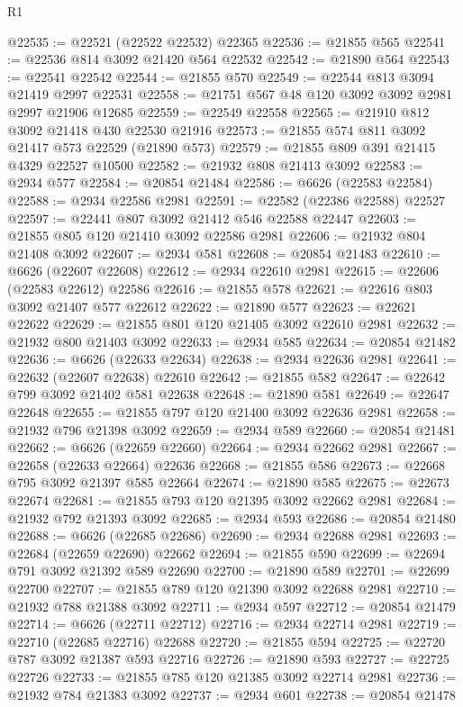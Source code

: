 \begin{lexlean}{R1}
\begin{coremodule}
@22535 := @22521 (@22522 @22532) @22365
@22536 := @21855 @565
@22541 := @22536 @814 @3092 @21420 @564 @22532
@22542 := @21890 @564
@22543 := @22541 @22542
@22544 := @21855 @570
@22549 := @22544 @813 @3094 @21419 @2997 @22531
@22558 := @21751 @567 @48 @120 @3092 @3092 @2981 @2997 @21906 @12685
@22559 := @22549 @22558
@22565 := @21910 @812 @3092 @21418 @430 @22530 @21916
@22573 := @21855 @574 @811 @3092 @21417 @573 @22529 (@21890 @573)
@22579 := @21855 @809 @391 @21415 @4329 @22527 @10500
@22582 := @21932 @808 @21413 @3092
@22583 := @2934 @577
@22584 := @20854 @21484
@22586 := @6626 (@22583 @22584)
@22588 := @2934 @22586 @2981
@22591 := @22582 (@22386 @22588) @22527
@22597 := @22441 @807 @3092 @21412 @546 @22588 @22447
@22603 := @21855 @805 @120 @21410 @3092 @22586 @2981
@22606 := @21932 @804 @21408 @3092
@22607 := @2934 @581
@22608 := @20854 @21483
@22610 := @6626 (@22607 @22608)
@22612 := @2934 @22610 @2981
@22615 := @22606 (@22583 @22612) @22586
@22616 := @21855 @578
@22621 := @22616 @803 @3092 @21407 @577 @22612
@22622 := @21890 @577
@22623 := @22621 @22622
@22629 := @21855 @801 @120 @21405 @3092 @22610 @2981
@22632 := @21932 @800 @21403 @3092
@22633 := @2934 @585
@22634 := @20854 @21482
@22636 := @6626 (@22633 @22634)
@22638 := @2934 @22636 @2981
@22641 := @22632 (@22607 @22638) @22610
@22642 := @21855 @582
@22647 := @22642 @799 @3092 @21402 @581 @22638
@22648 := @21890 @581
@22649 := @22647 @22648
@22655 := @21855 @797 @120 @21400 @3092 @22636 @2981
@22658 := @21932 @796 @21398 @3092
@22659 := @2934 @589
@22660 := @20854 @21481
@22662 := @6626 (@22659 @22660)
@22664 := @2934 @22662 @2981
@22667 := @22658 (@22633 @22664) @22636
@22668 := @21855 @586
@22673 := @22668 @795 @3092 @21397 @585 @22664
@22674 := @21890 @585
@22675 := @22673 @22674
@22681 := @21855 @793 @120 @21395 @3092 @22662 @2981
@22684 := @21932 @792 @21393 @3092
@22685 := @2934 @593
@22686 := @20854 @21480
@22688 := @6626 (@22685 @22686)
@22690 := @2934 @22688 @2981
@22693 := @22684 (@22659 @22690) @22662
@22694 := @21855 @590
@22699 := @22694 @791 @3092 @21392 @589 @22690
@22700 := @21890 @589
@22701 := @22699 @22700
@22707 := @21855 @789 @120 @21390 @3092 @22688 @2981
@22710 := @21932 @788 @21388 @3092
@22711 := @2934 @597
@22712 := @20854 @21479
@22714 := @6626 (@22711 @22712)
@22716 := @2934 @22714 @2981
@22719 := @22710 (@22685 @22716) @22688
@22720 := @21855 @594
@22725 := @22720 @787 @3092 @21387 @593 @22716
@22726 := @21890 @593
@22727 := @22725 @22726
@22733 := @21855 @785 @120 @21385 @3092 @22714 @2981
@22736 := @21932 @784 @21383 @3092
@22737 := @2934 @601
@22738 := @20854 @21478

\end{coremodule}
\end{lexlean}
